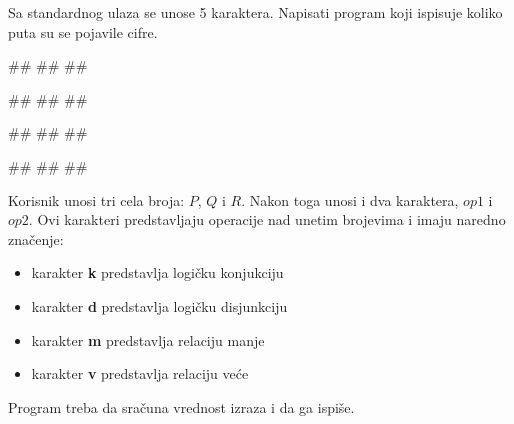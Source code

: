 \begin{Exercise}[label=p1.7_] 
Sa standardnog ulaza se unose 5 karaktera. Napisati program koji ispisuje koliko
puta su se pojavile cifre. \\
\begin{miditest}
\begin{upotreba}{1}
#\naslovInt#
##
##
\end{upotreba}
\end{miditest}
\begin{miditest}
\begin{upotreba}{2}
#\naslovInt#
##
##
\end{upotreba}
\end{miditest}

\begin{miditest}
\begin{upotreba}{3}
#\naslovInt#
##
##
\end{upotreba}
\end{miditest}
\begin{miditest}
\begin{upotreba}{4}
#\naslovInt#
##
##
\end{upotreba}
\end{miditest}
\end{Exercise}
\begin{Answer}[ref=p1.7_]
\end{Answer}

\begin{Exercise}[label=p1.9_]
Korisnik unosi tri cela broja: $P$, $Q$ i $R$.
Nakon toga unosi i dva karaktera, $op1$ i $op2$. Ovi karakteri predstavljaju operacije nad unetim brojevima i imaju naredno značenje:
\begin{itemize}
\item karakter \textbf{k} predstavlja  logičku konjukciju
\item karakter \textbf{d} predstavlja  logičku disjunkciju
\item karakter \textbf{m} predstavlja  relaciju manje
\item karakter \textbf{v} predstavlja  relaciju veće
\end{itemize}
Program treba da sračuna vrednost izraza 
 i da ga ispiše.
\end{Exercise}
\begin{Answer}[ref=p1.9_]
\end{Answer}


